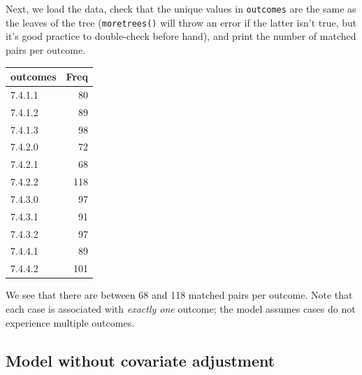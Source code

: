 \documentclass[]{article}
\newenvironment{Shaded}{\begin{snugshade}}{\end{snugshade}}
\newcommand{\CommentTok}[1]{\textcolor[rgb]{0.56,0.35,0.01}{\textit{#1}}}
\newcommand{\DataTypeTok}[1]{\textcolor[rgb]{0.13,0.29,0.53}{#1}}
\newcommand{\DecValTok}[1]{\textcolor[rgb]{0.00,0.00,0.81}{#1}}
\newcommand{\KeywordTok}[1]{\textcolor[rgb]{0.13,0.29,0.53}{\textbf{#1}}}
\newcommand{\NormalTok}[1]{#1}
\newcommand{\OperatorTok}[1]{\textcolor[rgb]{0.81,0.36,0.00}{\textbf{#1}}}
\newcommand{\StringTok}[1]{\textcolor[rgb]{0.31,0.60,0.02}{#1}}
\begin{document}
Next, we load the data, check that the unique values in
\texttt{outcomes} are the same as the leaves of the tree
(\texttt{moretrees()} will throw an error if the latter isn't true, but
it's good practice to double-check before hand), and print the number of
matched pairs per outcome.

\begin{Shaded}
\end{Shaded}

\begin{longtable}[]{@{}lr@{}}
\toprule
outcomes & Freq\tabularnewline
\midrule
\endhead
7.4.1.1 & 80\tabularnewline
7.4.1.2 & 89\tabularnewline
7.4.1.3 & 98\tabularnewline
7.4.2.0 & 72\tabularnewline
7.4.2.1 & 68\tabularnewline
7.4.2.2 & 118\tabularnewline
7.4.3.0 & 97\tabularnewline
7.4.3.1 & 91\tabularnewline
7.4.3.2 & 97\tabularnewline
7.4.4.1 & 89\tabularnewline
7.4.4.2 & 101\tabularnewline
\bottomrule
\end{longtable}

We see that there are between 68 and 118 matched pairs per outcome. Note
that each case is associated with \emph{exactly one} outcome; the model
assumes cases do not experience multiple outcomes.

\hypertarget{model-without-covariate-adjustment}{%
\subsection{Model without covariate
adjustment}\label{model-without-covariate-adjustment}}
\end{document}
